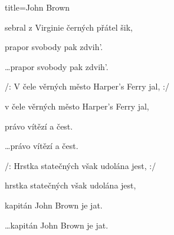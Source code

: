 \begin{song}{title=\predtitle \centering John Brown \\\large  }
\begin{centerjustified}
\begin{varwidth}[t]{0.58\textwidth}
sebral z Virginie černých přátel šik,

prapor svobody pak zdvih'.

\dots  prapor svobody pak zdvih'.

/: V čele věrných město Harper's Ferry jal, :/

v čele věrných město Harper's Ferry jal,

právo vítězí a čest.

\dots  právo vítězí a čest.

/: Hrstka statečných však udolána jest, :/

hrstka statečných však udolána jest,

kapitán John Brown je jat.

\dots  kapitán John Brown je jat.
\end{varwidth}\mezisloupci\begin{varwidth}[t]{0.4\textwidth}\setlength{\parindent}{\pindent}
\vspace*{0.6cm}
\phantom{/:\,Zvony\,Charlestonu\,z\,dáli\,temně\,zní,}
\end{varwidth}
\end{centerjustified}





\setcounter{Slokočet}{0}
\end{song}
